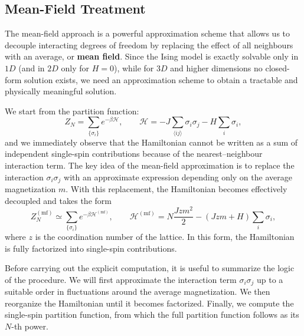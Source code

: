 \subsection{Mean-Field Treatment}

The mean-field approach is a powerful approximation scheme that allows us to decouple interacting degrees of freedom by replacing the effect of all neighbours with an average, or \textbf{mean field}. Since the Ising model is exactly solvable only in \(1D\) (and in \(2D\) only for \(H=0\)), while for \(3D\) and higher dimensions no closed-form solution exists, we need an approximation scheme to obtain a tractable and physically meaningful solution.

We start from the partition function:
\[
    Z_N = \sum_{\{\sigma_i\}} e^{-\beta \mathcal{H}},
    \qquad
    \mathcal{H} = -J \sum_{\langle ij \rangle} \sigma_i \sigma_j - H \sum_{i} \sigma_i,
\]
and we immediately observe that the Hamiltonian cannot be written as a sum of independent single-spin contributions because of the nearest–neighbour interaction term.
The key idea of the mean-field approximation is to replace the interaction \(\sigma_i \sigma_j\) with an approximate expression depending only on the average magnetization \(m\).
With this replacement, the Hamiltonian becomes effectively decoupled and takes the form
\[
    Z_N^{(\mathrm{mf})} \simeq \sum_{\{\sigma_i\}}
    e^{-\beta \mathcal{H}^{(\mathrm{mf})}},
    \qquad
    \mathcal{H}^{(\mathrm{mf})} =
    N \frac{J z m^2}{2} - (J z m + H)\sum_i \sigma_i,
\]
where \(z\) is the coordination number of the lattice. In this form, the Hamiltonian is fully factorized into single-spin contributions.

Before carrying out the explicit computation, it is useful to summarize the logic of the procedure. We will first approximate the interaction term \(\sigma_i \sigma_j\) up to a suitable order in fluctuations around the average magnetization. We then reorganize the Hamiltonian until it becomes factorized. Finally, we compute the single-spin partition function, from which the full partition function follows as its \(N\)-th power.

